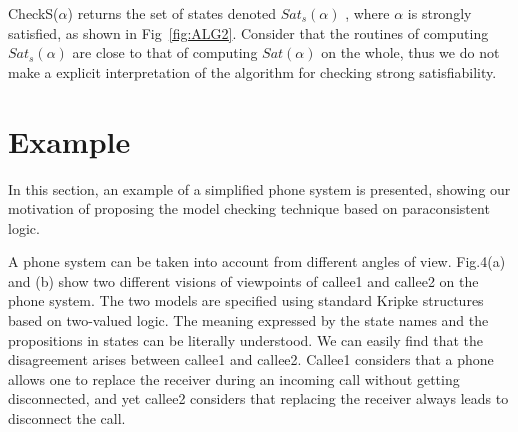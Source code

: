\documentclass{entcs}
\begin{document}
CheckS($\alpha$) returns the set of states denoted $Sat_s(\alpha)$
, where $\alpha$ is strongly satisfied, as shown in
Fig~\ref{fig:ALG2}. Consider that the routines of computing
 $Sat_s(\alpha)$ are close to that of computing $Sat(\alpha)$ on
 the whole, thus we do not make a explicit interpretation of the
 algorithm for checking strong satisfiability.

\section{Example}\label{Example}

In this section, an example of a simplified phone system is
presented, showing our motivation of proposing the model checking
technique based on paraconsistent logic.

A phone system can be taken into account from different angles of
view.  Fig.4(a) and (b) show   two different visions of viewpoints
of callee1 and callee2 on the phone system. The two models are
specified using standard Kripke structures based on two-valued
logic. The meaning expressed by the state names and the propositions
in states can be literally understood. We can easily find that the
disagreement arises between callee1 and callee2. Callee1 considers
that a phone allows one to replace the receiver during an incoming
call without getting disconnected, and yet callee2 considers that
replacing the receiver always leads to disconnect the call.
\end{document}
